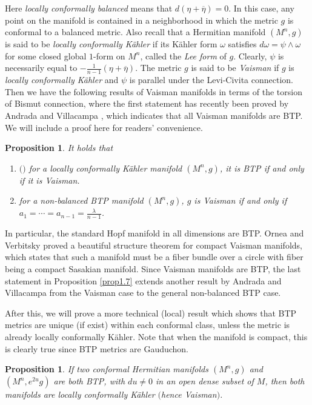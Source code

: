 \documentclass{amsart}
\numberwithin{equation}{section}
\newtheorem{proposition}[theorem]{Proposition}
\theoremstyle{definition}
\renewcommand{\1}{\mathds{1}}
\renewcommand{\>}{\rightarrow}
\begin{document}
Here {\em locally conformally balanced} means that $d(\eta +\overline{\eta})=0$.
In this case, any point on the manifold is contained in a neighborhood in which the metric $g$ is conformal to a balanced metric.
Also recall that a Hermitian manifold $(M^n,g)$ is said to be {\em locally conformally K\"ahler}
if its K\"ahler form $\omega$ satisfies $d\omega = \psi \wedge \omega$ for some closed global $1$-form on $M^n$,
called the {\em Lee form} of $g$. Clearly, $\psi$ is necessarily equal to $-\frac{1}{n-1}(\eta + \overline{\eta})$.
The metric $g$ is said to be {\em Vaisman} if $g$ is {\em locally conformally K\"ahler} and $\psi$ is parallel under the Levi-Civita connection.
Then we have the following results of Vaisman manifolds in terms of the torsion of Bismut connection,
where the first statement has recently been proved by Andrada and Villacampa \cite[Theorem 3.7]{AndV},
which indicates that all Vaisman manifolds are BTP. We will include a proof here for readers' convenience.

\begin{proposition}\label{prop1.8}
It holds that
\begin{enumerate}
\item $($\cite{AndV}$)$ for a locally conformally K\"ahler manifold $(M^n,g)$, it is BTP if and only if it is Vaisman.
\item for a non-balanced BTP manifold $(M^n,g)$, $g$ is Vaisman if and only if $a_1=\cdots =a_{n-1}=\frac{\lambda}{n-1}$.
\end{enumerate}
\end{proposition}

In particular, the standard Hopf manifold in all dimensions are BTP.
Ornea and Verbitsky \cite{OV03} proved a beautiful structure theorem for compact Vaisman manifolds,
which states that such a manifold must be a fiber bundle over a circle with fiber being a compact Sasakian manifold.
Since Vaisman manifolds are BTP, the last statement in Proposition \ref{prop1.7} extends another result \cite[Corollary 3.8]{AndV}
by Andrada and Villacampa from the Vaisman case to the general non-balanced BTP case.

After this, we will prove a more technical (local) result
which shows that BTP metrics are unique (if exist) within each conformal class, unless the metric is already locally conformally K\"ahler.
Note that when the manifold is compact, this is clearly true since BTP metrics are Gauduchon.

\begin{proposition} \label{prop1.9}
If two conformal Hermitian manifolds $(M^n,g)$ and $(M^n,e^{2u}g)$ are both BTP, with $du\neq 0$ in an open dense subset of $M$,
then  both manifolds are locally conformally K\"ahler $($hence Vaisman$)$.
\end{proposition}
\end{document}
